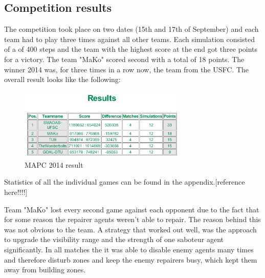 \subsection{Competition results}
The competition took place on two dates (15th and 17th of September) and each team had to play three times against all other teams. Each simulation consisted of a of 400 steps and the team with the highest score at the end got three points for a victory. The team "MaKo" scored second with a total of 18 points. The winner 2014 was, for three times in a row now, the team from the USFC. The overall result looks like the following:
\begin{figure}[h]
	\centering
	\includegraphics[width=300px]{Result.png}
	\caption{MAPC 2014 result}
	\label{dis:result}
\end{figure}
Statistics of all the individual games can be found in the appendix.[reference here!!!!] 

Team "MaKo" lost every second game against each opponent due to the fact that for some reason the repairer agents weren't able to repair. The reason behind this was not obvious to the team. A strategy that worked out well, was the approach to upgrade the visibility range and the strength of one saboteur agent significantly. In all matches the it was able to disable enemy agents many times and therefore disturb zones and keep the enemy repairers busy, which kept them away from building zones. 
